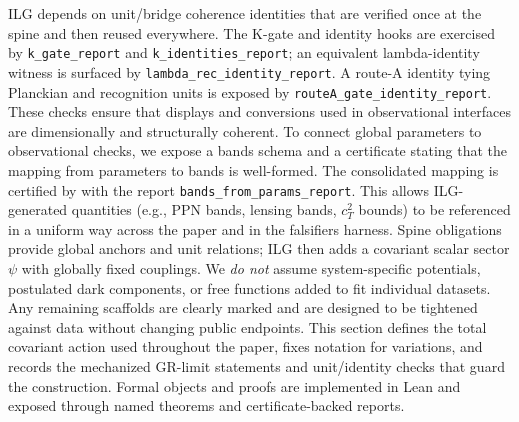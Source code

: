 \documentclass[aps,prd,twocolumn,superscriptaddress,nofootinbib,floatfix,longbibliography]{revtex4-2}
\newcommand{\lean}[1]{\texttt{\detokenize{#1}}}
\begin{document}
%
ILG depends on unit/bridge coherence identities that are verified once at the spine and then reused everywhere. The K-gate and identity hooks are exercised by \texttt{k\_gate\_report} and \texttt{k\_identities\_report}; an equivalent lambda-identity witness is surfaced by \texttt{lambda\_rec\_identity\_report}. A route-A identity tying Planckian and recognition units is exposed by \texttt{routeA\_gate\_identity\_report}. These checks ensure that displays and conversions used in observational interfaces are dimensionally and structurally coherent.
%
To connect global parameters to observational checks, we expose a bands schema and a certificate stating that the mapping from parameters to bands is well-formed. The consolidated mapping is certified by \lean{BandsFromParamsCert} with the report \texttt{bands\_from\_params\_report}. This allows ILG-generated quantities (e.g., PPN bands, lensing bands, $c_T^2$ bounds) to be referenced in a uniform way across the paper and in the falsifiers harness.
%
Spine obligations provide global anchors and unit relations; ILG then adds a covariant scalar sector $\psi$ with globally fixed couplings. We \emph{do not} assume system-specific potentials, postulated dark components, or free functions added to fit individual datasets. Any remaining scaffolds are clearly marked and are designed to be tightened against data without changing public endpoints.
%
%
This section defines the total covariant action used throughout the paper, fixes notation for variations, and records the mechanized GR-limit statements and unit/identity checks that guard the construction. Formal objects and proofs are implemented in Lean and exposed through named theorems and certificate-backed reports.
%
\end{document}
